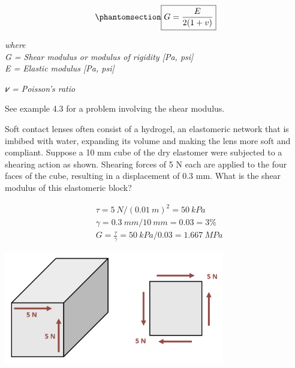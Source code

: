\documentclass[
  letterpaper,
  DIV=11,
  numbers=noendperiod]{scrreprt}
\theoremstyle{definition}
\theoremstyle{remark}
\begin{document}
\begin{equation}\phantomsection\label{eq-4.4}{
\boxed{G=\frac{E}{2(1+v)}}
}\end{equation}

\emph{where}\\
\emph{G = Shear modulus or modulus of rigidity {[}Pa, psi{]}}\\
\emph{E = Elastic modulus {[}Pa, psi{]}}

\emph{𝜈 = Poisson's ratio}

See example 4.3 for a problem involving the shear modulus.

\begin{tcolorbox}[enhanced jigsaw, leftrule=.75mm, colbacktitle=quarto-callout-tip-color!10!white, breakable, opacityback=0, colback=white, titlerule=0mm, toprule=.15mm, colframe=quarto-callout-tip-color-frame, coltitle=black, title={Example 4.3}, toptitle=1mm, bottomrule=.15mm, rightrule=.15mm, left=2mm, arc=.35mm, opacitybacktitle=0.6, bottomtitle=1mm]

Soft contact lenses often consist of a hydrogel, an elastomeric network
that is imbibed with water, expanding its volume and making the lens
more soft and compliant. Suppose a 10 mm cube of the dry elastomer were
subjected to a shearing action as shown. Shearing forces of 5 N each are
applied to the four faces of the cube, resulting in a displacement of
0.3 mm. What is the shear modulus of this elastomeric block?

\begin{tcolorbox}[enhanced jigsaw, leftrule=.75mm, colbacktitle=quarto-callout-tip-color!10!white, breakable, opacityback=0, colback=white, titlerule=0mm, toprule=.15mm, colframe=quarto-callout-tip-color-frame, coltitle=black, title={Solution}, toptitle=1mm, bottomrule=.15mm, rightrule=.15mm, left=2mm, arc=.35mm, opacitybacktitle=0.6, bottomtitle=1mm]

\[
\begin{aligned}
& \tau=5{~N} /(0.01{~m})^2=50{~kPa} \\
& \gamma=0.3{~mm}/10{~mm}=0.03=3 \% \\
& G=\frac{\tau}{\gamma}=50{~kPa}/0.03=1.667{~MPa}
\end{aligned}
\]

\begin{center}
\includegraphics[width=3.79167in,height=\textheight]{images/CH4 PNGs/example 4.3.png}
\end{center}

\end{tcolorbox}

\end{tcolorbox}
\end{document}
